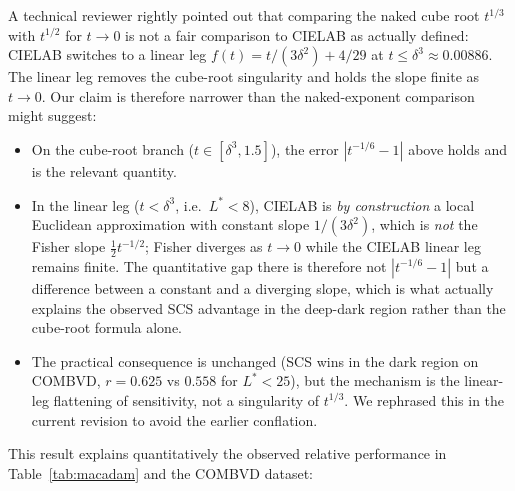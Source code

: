 \documentclass[12pt,a4paper]{article}
\begin{document}
\begin{remark}
A technical reviewer rightly pointed out that comparing the naked
cube root $t^{1/3}$ with $t^{1/2}$ for $t \to 0$ is not a fair comparison
to CIELAB as actually defined: CIELAB switches to a linear leg
$f(t) = t/(3\delta^2) + 4/29$ at $t \leq \delta^3 \approx 0.00886$. The
linear leg removes the cube-root singularity and holds the slope finite
as $t \to 0$. Our claim is therefore narrower than the naked-exponent
comparison might suggest:
\begin{itemize}[nosep]
\item On the cube-root branch ($t \in [\delta^3, 1.5]$), the error
  $|t^{-1/6}-1|$ above holds and is the relevant quantity.
\item In the linear leg ($t < \delta^3$, i.e.\ $L^* < 8$), CIELAB is
  \emph{by construction} a local Euclidean approximation with constant
  slope $1/(3\delta^2)$, which is \emph{not} the Fisher slope
  $\tfrac{1}{2}t^{-1/2}$; Fisher diverges as $t \to 0$ while the CIELAB
  linear leg remains finite. The quantitative gap there is therefore
  not $|t^{-1/6}-1|$ but a difference between a constant and a diverging
  slope, which is what actually explains the observed SCS advantage in
  the deep-dark region rather than the cube-root formula alone.
\item The practical consequence is unchanged (SCS wins in the dark
  region on COMBVD, $r = 0.625$ vs $0.558$ for $L^* < 25$), but the
  mechanism is the linear-leg flattening of sensitivity, not a
  singularity of $t^{1/3}$. We rephrased this in the current revision
  to avoid the earlier conflation.
\end{itemize}
\end{remark}

This result explains quantitatively the observed relative performance
in Table~\ref{tab:macadam} and the COMBVD dataset:
\end{document}
